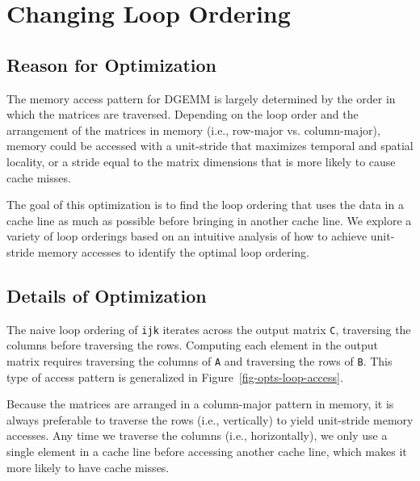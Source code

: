 
\section{Changing Loop Ordering}
\label{sec-opts-loop}

\subsection{Reason for Optimization}

The memory access pattern for DGEMM is largely determined by the order in
which the matrices are traversed. Depending on the loop order and the
arrangement of the matrices in memory (i.e., row-major vs. column-major),
memory could be accessed with a unit-stride that maximizes temporal and
spatial locality, or a stride equal to the matrix dimensions that is more
likely to cause cache misses.
\smallskip

The goal of this optimization is to find the loop ordering that uses the
data in a cache line as much as possible before bringing in another cache
line. We explore a variety of loop orderings based on an intuitive
analysis of how to achieve unit-stride memory accesses to identify the
optimal loop ordering.
\smallskip

\subsection{Details of Optimization}



The naive loop ordering of {\tt{ijk}} iterates across the output matrix
{\tt{C}}, traversing the columns before traversing the rows. Computing
each element in the output matrix requires traversing the columns of
{\tt{A}} and traversing the rows of {\tt{B}}. This type of access pattern
is generalized in Figure~\ref{fig-opts-loop-access}.
\smallskip

Because the matrices are arranged in a column-major pattern in memory,
it is always preferable to traverse the rows (i.e., vertically) to yield
unit-stride memory accesses. Any time we traverse the columns (i.e.,
horizontally), we only use a single element in a cache line before
accessing another cache line, which makes it more likely to have cache
misses.
\smallskip

